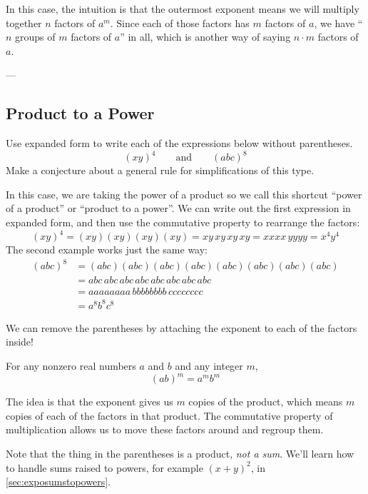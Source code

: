 In this case, the intuition is that the outermost exponent means we will multiply together $n$ factors of $a^m$. Since each of those factors has $m$ factors of $a$, we have ``$n$ groups of $m$ factors of $a$'' in all, which is another way of saying $n \cdot m$ factors of $a$.

\begin{boxedex}
---
\end{boxedex}


\subsection{Product to a Power}

\begin{boxedexplore}
Use expanded form to write each of the expressions below without parentheses.
\[(xy)^4 \qquad\text{and}\qquad (abc)^8\]
Make a conjecture about a general rule for simplifications of this type.
\end{boxedexplore}

In this case, we are taking the power of a product so we call this shortcut ``power of a product'' or ``product to a power''. We can write out the first expression in expanded form, and then use the commutative property to rearrange the factors:
\[(xy)^4 = (xy)(xy)(xy)(xy) = xy\,xy\,xy\,xy = xxxx\,yyyy = x^4y^4\]
The second example works just the same way:
\[
\begin{aligned}(abc)^8 &= (abc)(abc)(abc)(abc)(abc)(abc)(abc)(abc)
\\ &= abc\,abc\,abc\,abc\,abc\,abc\,abc\,abc
\\ &= aaaaaaaa\,bbbbbbbb\,cccccccc
\\ &= a^8b^8c^8
\end{aligned}\]

We can remove the parentheses by attaching the exponent to each of the factors inside!

\begin{boxeddef}
For any nonzero real numbers $a$ and $b$ and any integer $m$, \[(ab)^m = a^m b^m\]
\end{boxeddef}

The idea is that the exponent gives us $m$ copies of the product, which means $m$ copies of each of the factors in that product. The commutative property of multiplication allows us to move these factors around and regroup them.

Note that the thing in the parentheses is a product, \textit{not a sum}. We'll learn how to handle sums raised to powers, for example $(x+y)^2$, in \cref{sec:exposumstopowers}.

